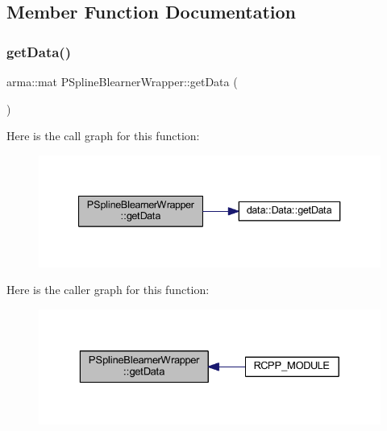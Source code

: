 \subsection{Member Function Documentation}
\mbox{\label{class_p_spline_blearner_wrapper_ad18db8163e5356b45e5196a51d2561a8}} 
\subsubsection{\texorpdfstring{get\+Data()}{getData()}}
{\footnotesize\ttfamily arma\+::mat P\+Spline\+Blearner\+Wrapper\+::get\+Data (\begin{DoxyParamCaption}{ }\end{DoxyParamCaption})\hspace{0.3cm}{\ttfamily [inline]}}

Here is the call graph for this function\+:\nopagebreak
\begin{figure}[H]
\begin{center}
\leavevmode
\includegraphics[width=340pt]{class_p_spline_blearner_wrapper_ad18db8163e5356b45e5196a51d2561a8_cgraph}
\end{center}
\end{figure}
Here is the caller graph for this function\+:\nopagebreak
\begin{figure}[H]
\begin{center}
\leavevmode
\includegraphics[width=329pt]{class_p_spline_blearner_wrapper_ad18db8163e5356b45e5196a51d2561a8_icgraph}
\end{center}
\end{figure}
\mbox{\label{class_p_spline_blearner_wrapper_a2d9c9e319c4638c85a4d419918929f9b}} 

